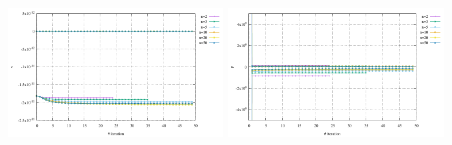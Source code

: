 \begin{center}
\includegraphics[width=5.7cm]{python_codes/fieldstone_87/results/experiment_02/v}
\includegraphics[width=5.7cm]{python_codes/fieldstone_87/results/experiment_02/p}\\
\end{center}

